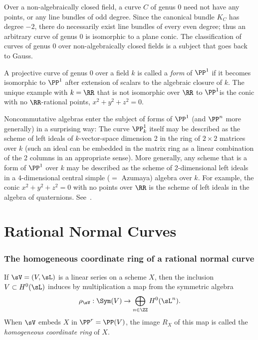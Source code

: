 \begin{fact}
Over a non-algebraically closed field, a curve $C$ of genus 0 need not have any points, or any line bundles of odd degree. Since the canonical bundle $K_C$ has degree $-2$, there do necessarily exist line bundles of every even degree; thus an arbitrary curve of genus 0 is isomorphic to a  plane conic. 
The classification of curves of genus 0 over non-algebraically closed fields is a subject that goes back to Gauss.

A projective curve of genus 0 over a field $k$ is called a \emph{form} of $\PP^1$ if it becomes isomorphic to $\PP^1$ after extension
of scalars to
the algebraic closure of $k$. The unique example with $k = \RR$ that is not isomorphic over $\RR$ to $\PP^1$is the conic with no $\RR$-rational points, $x^2+y^2+z^2 = 0$. 

Noncommutative algebras enter the subject of forms of $\PP^1$ (and $\PP^n$ more generally) in a surprising way: The curve $\PP_k^1$ itself may be described as the scheme of left ideals of $k$-vector-space dimension 2 in the ring of
$2\times 2$ matrices over $k$ (such an ideal can be embedded in the matrix ring as a linear combination of the 2 columns in an appropriate sense). More generally, any scheme that is a form of $\PP^1$ over $k$
may be described as the scheme of 2-dimensional left ideals in a 4-dimensional central simple ($=$ Azumaya) algebra over $k$. For example, the
conic $x^2+y^2+z^2 = 0$ with no points over $\RR$ is the scheme of left ideals in the algebra of quaternions. See~\cite[Section X.6]{Serre1979}.
\end{fact}

\section{Rational Normal Curves}\label{rational normal curves section}

\subsubsection{The homogeneous coordinate ring of a rational normal curve}

If $\sV = (V,\sL)$ is a linear series on a scheme $X$, then the inclusion
$V\subset H^0(\sL)$ induces by multiplication a map from the symmetric algebra
$$
\rho_{\sV}: \Sym(V) \to  \bigoplus_{n\in \ZZ} H^0(\sL^n).
$$
When $\sV$ embeds $X$ in $\PP^r = \PP(V)$, the image $R_{X}$ of this map is called the \emph{homogeneous coordinate ring} of $X$. 

